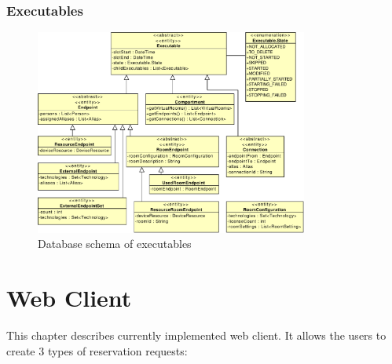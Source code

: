 \cleardoublepage
\subsection{Executables}

\begin{figure}[ht!]
\centering\includegraphics[width=0.8\textwidth]{diagrams/cd_executables}
\caption{Database schema of executables}
\label{fig:executables}
\end{figure}




\chapter{Web Client}

This chapter describes currently implemented web client. It allows the users to create 3 types of reservation requests:

